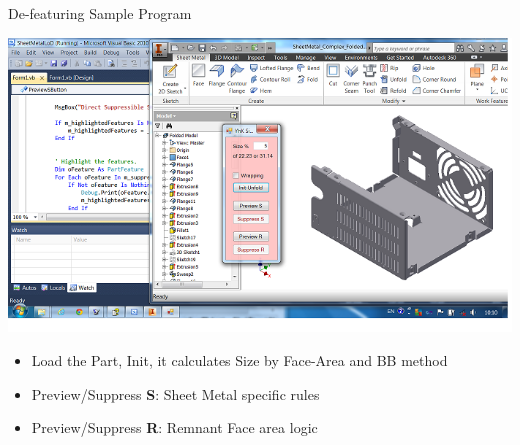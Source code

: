 \begin{frame}{De-featuring Sample Program}

\includegraphics[width=0.9\linewidth]{../Common/images/ImplDefeaturingProgram.png}
\begin{itemize}
\item Load the Part, Init, it calculates Size by Face-Area and BB method
\item Preview/Suppress \textbf{S}: Sheet Metal specific rules
\item Preview/Suppress \textbf{R}: Remnant Face area logic
\end{itemize}

\end{frame}
